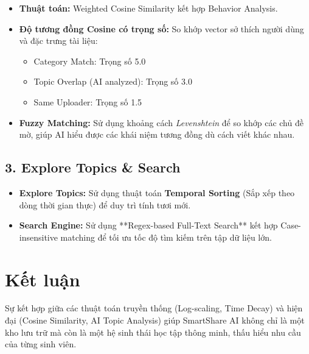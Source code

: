 \documentclass{article}
\begin{document}
\begin{itemize}
    \item \textbf{Thuật toán:} Weighted Cosine Similarity kết hợp Behavior Analysis.
    \item \textbf{Độ tương đồng Cosine có trọng số:} So khớp vector sở thích người dùng và đặc trưng tài liệu:
    \begin{itemize}
        \item Category Match: Trọng số 5.0
        \item Topic Overlap (AI analyzed): Trọng số 3.0
        \item Same Uploader: Trọng số 1.5
    \end{itemize}
    \item \textbf{Fuzzy Matching:} Sử dụng khoảng cách \textit{Levenshtein} để so khớp các chủ đề mờ, giúp AI hiểu được các khái niệm tương đồng dù cách viết khác nhau.
\end{itemize}

\subsection{3. Explore Topics & Search}
\begin{itemize}
    \item \textbf{Explore Topics:} Sử dụng thuật toán \textbf{Temporal Sorting} (Sắp xếp theo dòng thời gian thực) để duy trì tính tươi mới.
    \item \textbf{Search Engine:} Sử dụng **Regex-based Full-Text Search** kết hợp Case-insensitive matching để tối ưu tốc độ tìm kiếm trên tập dữ liệu lớn.
\end{itemize}

\section{Kết luận}
Sự kết hợp giữa các thuật toán truyền thống (Log-scaling, Time Decay) và hiện đại (Cosine Similarity, AI Topic Analysis) giúp SmartShare AI không chỉ là một kho lưu trữ mà còn là một hệ sinh thái học tập thông minh, thấu hiểu nhu cầu của từng sinh viên.
\end{document}
